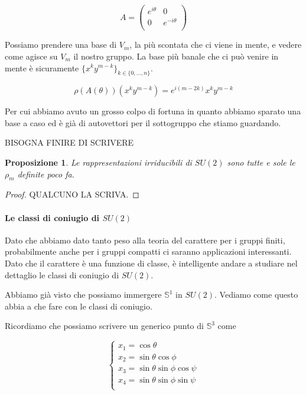 \documentclass[11pt]{article}
\theoremstyle{plain}
\newtheorem{prop}[thm]{Proposizione}
\theoremstyle{definition}
\theoremstyle{remark}
\begin{document}
 \[
 A = 
 \left(
 \begin{array}{cc}
   e^{i\theta} & 0 \\
   0 & e^{-i\theta} \\
 \end{array} 
 \right)
 \]


 Possiamo prendere una base di $V_m$, la più scontata che ci viene in mente, e vedere come agisce su $V_m$ il nostro gruppo. La base più banale che ci può venire in mente è sicuramente $\{ x^ky^{m-k} \}_{k \in \{0, ..., n\}}$.

 \[ \rho(A(\theta)) (x^ky^{m-k}) = e^{i(m-2k)} x^k y^{m-k} \]

 Per cui abbiamo avuto un grosso colpo di fortuna in quanto abbiamo sparato una base a caso ed è già di autovettori per il sottogruppo che stiamo guardando.

 BISOGNA FINIRE DI SCRIVERE

 \begin{prop}
   \label{prop:rapp su2}
   Le rappresentazioni irriducibili di $SU(2)$ sono tutte e sole le $\rho_m$ definite poco fa.
 \end{prop}

 \begin{proof}
   QUALCUNO LA SCRIVA.
 \end{proof}
 

 \paragraph{Le classi di coniugio di $SU(2)$}
 Dato che abbiamo dato tanto peso alla teoria del carattere per i gruppi finiti, probabilmente anche per i gruppi compatti ci saranno applicazioni interessanti. Dato che il carattere è una funzione di classe, è intelligente andare a studiare nel dettaglio le classi di coniugio di $SU(2)$.


 Abbiamo già visto che possiamo immergere $\mathbb{S}^1$ in $SU(2)$. Vediamo come questo abbia a che fare con le classi di coniugio.


 Ricordiamo che possiamo scrivere un generico punto di $\mathbb{S}^3$ come

 \[
 \begin{cases}
 x_1 = \cos\theta \\
 x_2 = \sin\theta\cos\phi \\
 x_3 = \sin\theta\sin\phi\cos\psi \\
 x_4 = \sin\theta\sin\phi\sin\psi \\
 \end{cases}
 \]
\end{document}
